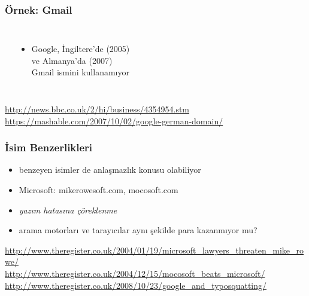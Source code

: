 \documentclass[dvipsnames]{beamer}
\theoremstyle{plain}
\begin{document}
\begin{frame}
  \frametitle{Örnek: Gmail}

  \begin{columns}
    \begin{center}
    \end{center}

    \begin{itemize}
      \item Google, İngiltere'de (2005)\\
        ve Almanya'da (2007)\\
        Gmail ismini kullanamıyor
    \end{itemize}
  \end{columns}

  \medskip
  \tiny{\url{http://news.bbc.co.uk/2/hi/business/4354954.stm}}\\
  \tiny{\url{https://mashable.com/2007/10/02/google-german-domain/}}\\
\end{frame}

\begin{frame}
  \frametitle{İsim Benzerlikleri}

  \begin{itemize}
    \item benzeyen isimler de anlaşmazlık konusu olabiliyor
    \item Microsoft: mikerowesoft.com, mocosoft.com

    \pause
    \bigskip
    \item \emph{yazım hatasına çöreklenme}
    \item arama motorları ve tarayıcılar aynı şekilde para kazanmıyor mu?
  \end{itemize}

  \medskip
  \tiny{\url{http://www.theregister.co.uk/2004/01/19/microsoft_lawyers_threaten_mike_rowe/}}\\
  \tiny{\url{http://www.theregister.co.uk/2004/12/15/mocosoft_beats_microsoft/}}\\
  \tiny{\url{http://www.theregister.co.uk/2008/10/23/google_and_typosquatting/}}\\
\end{frame}
\end{document}
